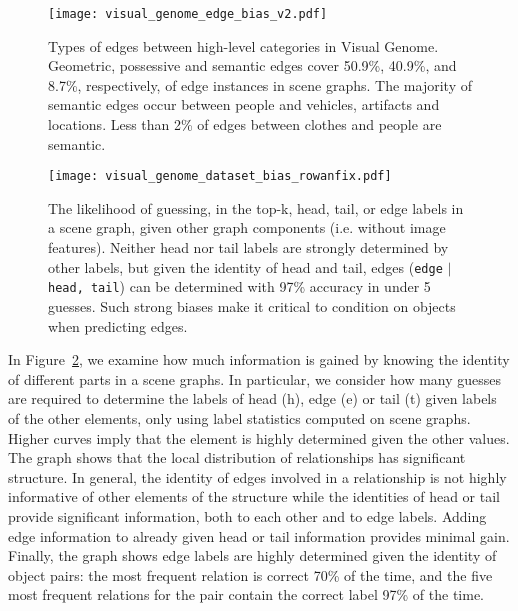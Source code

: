 \documentclass[10pt,twocolumn,letterpaper]{article}
\begin{document}
\begin{figure}[t]
    \vspace{-.2cm}
    \centering
    \texttt{[image: visual\_genome\_edge\_bias\_v2.pdf]}
    \caption{Types of edges between high-level categories in Visual Genome. Geometric, possessive and semantic edges cover 50.9\%, 40.9\%, and 8.7\%, respectively, of edge instances in scene graphs. The majority of semantic edges occur between people and vehicles, artifacts and locations. %
    Less than 2\% of edges between clothes and people are semantic.}
    \label{fig:edges}
\end{figure}\begin{figure}[t]
    \vspace{-.3cm}
    \centering
    \texttt{[image: visual\_genome\_dataset\_bias\_rowanfix.pdf]}
    \caption{The likelihood of guessing, in the top-k, head, tail, or edge labels in a scene graph, given other graph components (i.e. without image features). Neither head nor tail labels are strongly determined by other labels, but given the identity of head and tail, edges (\texttt{edge} $|$ \texttt{head, tail}) can be determined with 97\% accuracy in under 5 guesses. Such strong biases make it critical to condition on objects when predicting edges.} %
    \label{fig:conditionals}
\end{figure}
In Figure~\ref{fig:conditionals}, we examine how much information is gained by knowing the identity of different parts %
in a scene graphs.
In particular, we consider how many guesses are required to determine the labels of head (h), edge (e) or tail (t) given labels of the other elements, only using label statistics computed on scene graphs.
Higher curves imply that the element is highly determined given the other values.
The graph shows that the local distribution of relationships has significant structure.
In general, the identity of edges involved in a relationship is not highly informative of other elements of the structure while the identities of head or tail provide significant information, both to each other and to edge labels.
Adding edge information to already given head or tail information provides minimal gain.
Finally, the graph shows edge labels are highly determined given the identity of object pairs:
the most frequent relation is correct 70\% of the time, and
the five most frequent relations for the pair contain the correct label 97\% of the time.
\end{document}

